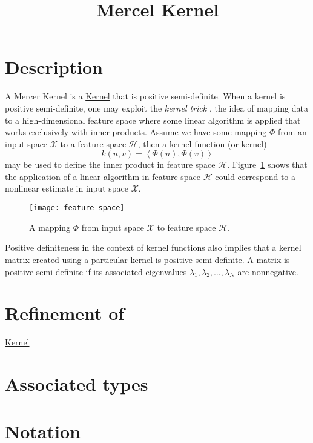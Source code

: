 \documentclass{article}
\begin{document}
\title{Mercel Kernel}
\maketitle

\section*{Description}

A Mercer Kernel is a \href{\kmlroot/reference/kernel.html}{Kernel} that is positive semi-definite.
When a kernel is positive semi-definite, 
one may exploit the \emph{kernel trick} \cite{aizerman64theoretical}, 
the idea of mapping data to a high-dimensional feature space where some linear algorithm is applied that works exclusively with inner products. Assume we have some mapping $\Phi$ from an input space $\mathcal{X}$ to a feature space $\mathcal{H}$, then a kernel function (or kernel)
%
$$ k(u,v)=\left\langle \Phi( u ), \Phi( v ) \right\rangle$$
%
may be used to define the inner product in feature space $\mathcal{H}$.
Figure~\ref{figure:feature_space} shows that the application of a linear algorithm in feature 
space $\mathcal{H}$ could correspond to a nonlinear estimate in input space $\mathcal{X}$.

\begin{figure}
\texttt{[image: feature\_space]}
\caption{A mapping $\Phi$ from input space $\mathcal{X}$ to feature space $\mathcal{H}$.}
\label{figure:feature_space}
\end{figure}

Positive definiteness in the context of kernel functions also implies that a 
kernel matrix created using 
a particular kernel is positive semi-definite. A matrix is positive semi-definite if its associated eigenvalues
$\lambda_1,\lambda_2,\ldots,\lambda_N$ are nonnegative.

\section*{Refinement of}

\href{\kmlroot/reference/kernel.html}{Kernel}

\section*{Associated types}
\section*{Notation}
\end{document}
